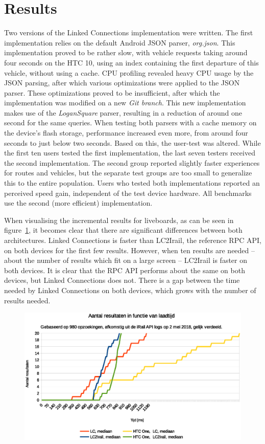 \documentclass[twocolumn]{phdsymp} %
\begin{document}
\section{Results}

Two versions of the Linked Connections implementation were written. The first implementation relies on the default Android JSON parser, \emph{org.json}. This implementation proved to be rather slow, with vehicle requests taking around four seconds on the HTC 10, using an index containing the first departure of this vehicle, without using a cache. CPU profiling revealed heavy CPU usage by the JSON parsing, after which various optimizations were applied to the JSON parser. These optimizations proved to be insufficient, after which the implementation was modified on a new \emph{Git branch}. This new implementation makes use of the \emph{LoganSquare} parser, resulting in a reduction of around one second for the same queries. When testing both parsers with a cache memory on the device's flash storage, performance increased even more, from around four seconds to just below two seconds. Based on this, the user-test was altered. While the first ten users tested the first implementation, the last seven testers received the second implementation. The second group reported slightly faster experiences for routes and vehicles, but the separate test groups are too small to generalize this to the entire population. Users who tested both implementations reported an perceived speed gain, independent of the test device hardware. All benchmarks use the second (more efficient) implementation.

When visualising the incremental results for liveboards, as can be seen in figure~\ref{fig:liveboard}, it becomes clear that there are significant differences between both architectures. Linked Connections is faster than LC2Irail, the reference RPC API, on both devices for the first few results. However, when ten results are needed -- about the number of results which fit on a large screen -- LC2Irail is faster on both devices.
It is clear that the RPC API performs about the same on both devices, but Linked Connections does not. There is a gap between the time needed by Linked Connections on both devices, which grows with the number of results needed.

\begin{figure}[ht]
	\begin{center}
		\includegraphics[width=.50\textwidth]{images/dief_liveboards_gemiddeld.eps}
		\caption{\label{fig:liveboard} }
	\end{center}
\end{figure}
\end{document}
